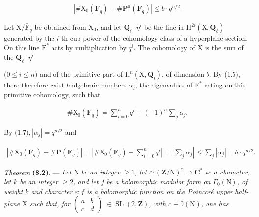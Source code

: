 \documentclass[10pt,leqno]{article}
\begin{document}
\begin{equation*}\begin{gathered}|\# \mathrm{X}_{0}(\mathbf{F}_{q})- \# \mathbf{P}^{n}(\mathbf{F}_{q})| \leq  b\cdot q^{n/2}.\end{gathered}\end{equation*}

\noindent Let \(\mathrm{X}/\overline{\mathbf{F}}_{q}\) be obtained from \(\mathrm{X}_{0}\), and let \(\mathbf{Q}_{\ell }\cdot \eta ^{i}\) be the line in \(\mathrm{H}^{2i}(\mathrm{X},\mathbf{Q}_{\ell })\) generated by the \(i\)-th cup power of the cohomology class of a hyperplane section. On this line \(\mathrm{F}^{*}\) acts by multiplication by \(q^{i}\). The cohomology of \(\mathrm{X}\) is the sum of the \(\mathbf{Q}_{\ell }\cdot \eta ^{i}\)\par

\clearpage

\label{physical-31}\par\smallskip

\noindent (\(0 \leq  i \leq  n)\) and of the primitive part of \(\mathrm{H}^{n}(\mathrm{X}, \mathbf{Q}_{\ell })\), of dimension \(b\). By (1.5), there therefore exist \(b\) algebraic numbers \(\alpha _{j}\), the eigenvalues of \(\mathrm{F}^{*}\) acting on this primitive cohomology, such that\par

\begin{equation*}\begin{gathered}\# \mathrm{X}_{0}(\mathbf{F}_{q}) = \sum _{i=0}^{n} q^{i} + (-1)^{n} \sum _{j} \alpha _{j}.\end{gathered}\end{equation*}

\noindent By (\(1.7), |\alpha _{j}| = q^{n/2}\) and\par

\begin{equation*}\begin{gathered}|\# \mathrm{X}_{0}(\mathbf{F}_{q}) - \# \mathbf{P}(\mathbf{F}_{q})| = |\# \mathrm{X}_{0}(\mathbf{F}_{q}) - \sum _{i=0}^{n} q^{i}| = |\sum _{j} \alpha _{j}| \leq  \sum _{j} |\alpha _{j}| = b\cdot q^{n/2}.\end{gathered}\end{equation*}

\noindent \emph{Theorem} \textbf{(8.2)}. — {\itshape Let \(\mathrm{N}\) be an integer \(\geq  1\), let \(\varepsilon  : (\mathbf{Z}/\mathrm{N})^{*} \longrightarrow  \mathbf{C}^{*}\) be a character, let \(k\) be an integer \(\geq  2\), and let \(f\) be a holomorphic modular form on \(\Gamma _{0}(\mathrm{N})\), of weight \(k\) and character \(\varepsilon : f\) is a holomorphic function on the Poincaré upper half-plane \(\mathrm{X}\) such that, for \(\begin{pmatrix}a&b\\c&d\end{pmatrix}\) \(\in  \operatorname{SL}(2, \mathbf{Z})\), with \(c \equiv  0 (\mathrm{N})\), one has}\par
\end{document}
